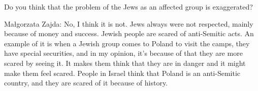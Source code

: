 Do you think that the problem of the Jews as an affected group is exaggerated? 

Małgorzata Zajda:  No, I think it is not. Jews always were not respected, mainly because of money and success. 
Jewish people are scared of anti-Semitic acts. An example of it is when a Jewish group comes to Poland to visit the camps, they have special securities, and in my opinion, it’s because of that they are more scared by seeing it. It makes them think that they are in danger and it might make them feel scared. People in Israel think that Poland is an anti-Semitic country, and they are scared of it because of history.  

 

 
